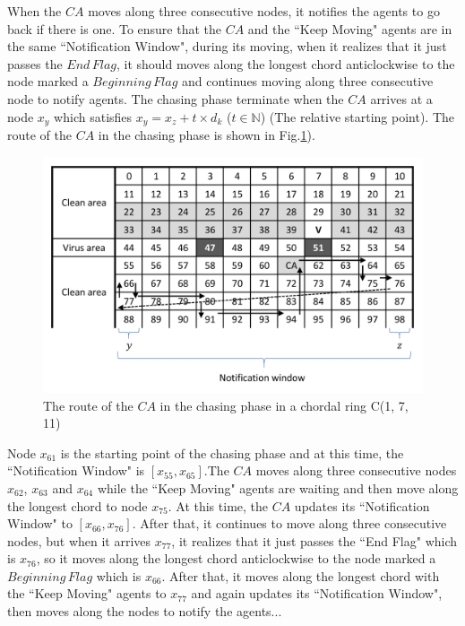 When the $CA$ moves along three consecutive nodes, it notifies the agents to go back if there is one. To ensure that the $CA$ and the ``Keep Moving" agents are in the same ``Notification Window", during its moving, when it realizes that it just passes the $End\,Flag$, it should moves along the longest chord anticlockwise to the node marked a $Beginning\,Flag$ and continues moving along three consecutive node to notify agents. The chasing phase terminate when the $CA$ arrives at a  node $x_y$ which satisfies $x_y=x_z+t\times{d_k}$ ($t\in \mathbb{N}$) (The relative starting point). The route of the $CA$ in the chasing phase is shown in Fig.\ref{fig:chasing}). 
\begin{figure}[H]
  \centering  
  \includegraphics[width=1.0\textwidth]{figures/chasing.png}
  \caption{The route of the $CA$ in the chasing phase in a chordal ring C(1, 7, 11)}\label{fig:chasing}
\end{figure}

Node $x_{61}$ is the starting point of the chasing phase and at this time, the ``Notification Window" is $[x_{55}, x_{65}]$.The $CA$ moves along three consecutive nodes $x_{62}$, $x_{63}$ and $x_{64}$ while the ``Keep Moving" agents are waiting and then move along the longest chord to node $x_{75}$. At this time, the $CA$ updates its ``Notification Window" to $[x_{66}, x_{76}]$. After that, it continues to move along three consecutive nodes, but when it arrives $x_{77}$, it realizes that it just passes the ``End Flag" which is $x_{76}$, so it moves along the longest chord  anticlockwise to the node marked a $Beginning\,Flag$ which is $x_{66}$. After that, it moves along the longest chord with the ``Keep Moving" agents to $x_{77}$ and again updates its ``Notification Window", then moves along the nodes to notify the agents...

